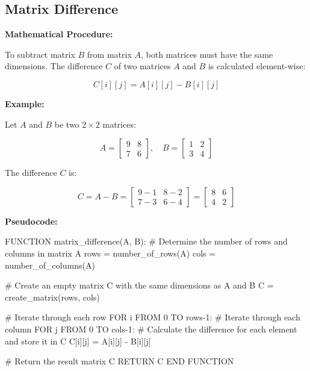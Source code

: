 \documentclass[
  letterpaper,
  DIV=11,
  numbers=noendperiod]{scrreprt}
\newenvironment{Shaded}{\begin{snugshade}}{\end{snugshade}}
\newcommand{\CommentTok}[1]{\textcolor[rgb]{0.37,0.37,0.37}{#1}}
\newcommand{\DecValTok}[1]{\textcolor[rgb]{0.68,0.00,0.00}{#1}}
\newcommand{\NormalTok}[1]{\textcolor[rgb]{0.00,0.23,0.31}{#1}}
\newcommand{\OperatorTok}[1]{\textcolor[rgb]{0.37,0.37,0.37}{#1}}
\theoremstyle{plain}
\theoremstyle{definition}
\theoremstyle{remark}
\begin{document}
\subsection{Matrix Difference}\label{matrix-difference}

\textbf{Mathematical Procedure:}

To subtract matrix \(B\) from matrix \(A\), both matrices must have the
same dimensions. The difference \(C\) of two matrices \(A\) and \(B\) is
calculated element-wise:

\[ C[i][j] = A[i][j] - B[i][j] \]

\textbf{Example:}

Let \(A\) and \(B\) be two \(2 \times 2\) matrices:

\[ A = \begin{bmatrix} 9 & 8 \\ 7 & 6 \end{bmatrix}, \quad B = \begin{bmatrix} 1 & 2 \\ 3 & 4 \end{bmatrix} \]

The difference \(C\) is:

\[ C = A - B = \begin{bmatrix} 9-1 & 8-2 \\ 7-3 & 6-4 \end{bmatrix} = \begin{bmatrix} 8 & 6 \\ 4 & 2 \end{bmatrix} \]

\textbf{Pseudocode:}

\begin{Shaded}
\begin{Highlighting}[]
\NormalTok{FUNCTION matrix\_difference(A, B):}
    \CommentTok{\# Determine the number of rows and columns in matrix A}
\NormalTok{    rows }\OperatorTok{=}\NormalTok{ number\_of\_rows(A)}
\NormalTok{    cols }\OperatorTok{=}\NormalTok{ number\_of\_columns(A)}
    
    \CommentTok{\# Create an empty matrix C with the same dimensions as A and B}
\NormalTok{    C }\OperatorTok{=}\NormalTok{ create\_matrix(rows, cols)}
    
    \CommentTok{\# Iterate through each row}
\NormalTok{    FOR i FROM }\DecValTok{0}\NormalTok{ TO rows}\OperatorTok{{-}}\DecValTok{1}\NormalTok{:}
        \CommentTok{\# Iterate through each column}
\NormalTok{        FOR j FROM }\DecValTok{0}\NormalTok{ TO cols}\OperatorTok{{-}}\DecValTok{1}\NormalTok{:}
            \CommentTok{\# Calculate the difference for each element and store it in C}
\NormalTok{            C[i][j] }\OperatorTok{=}\NormalTok{ A[i][j] }\OperatorTok{{-}}\NormalTok{ B[i][j]}
    
    \CommentTok{\# Return the result matrix C}
\NormalTok{    RETURN C}
\NormalTok{END FUNCTION}
\end{Highlighting}
\end{Shaded}
\end{document}
